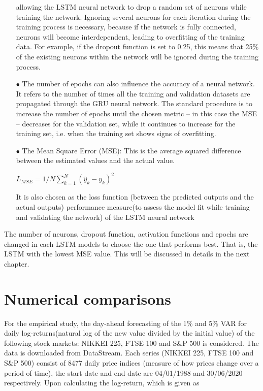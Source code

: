\documentclass[a4paper,11pt,oneside]{book}
\begin{document}
\begin{itemize}
allowing the LSTM neural network to drop a random set of neurons while
training the network. Ignoring several neurons for each iteration during the
training process is necessary, because if the network is fully connected,
neurons will become interdependent, leading to overfitting of the training data. For example, if the dropout function is set to 0.25, this means that 25\% of the existing
neurons within the network will be ignored during the training process.
\item[$\bullet$] The number of epochs can also influence the accuracy of a neural network. It
refers to the number of times all the training and validation datasets are
propagated through the GRU neural network. The standard procedure is to
increase the number of epochs until the chosen metric – in this case the MSE
– decreases for the validation set, while it continues to increase for the training
set, i.e. when the training set shows signs of overfitting.
\item[$\bullet$] The Mean Square Error (MSE): This is the average squared difference between the estimated values and the actual value.

\begin{center}
	$L_{MSE} = 1/N\sum_{k=1}^{N} ({\hat{y}}_{k}-y_k)^2$
\end{center}
It is also chosen as the loss function (between the predicted outputs and the actual outputs) performance measure(to assess the model fit while
training and validating the network) of the
LSTM neural network
\end{itemize}

The number of neurons, dropout function, activation functions and epochs are changed in each LSTM models to choose the one that performs best. That is, the LSTM with the lowest MSE value. This will be discussed in details in the next chapter.


\chapter{Numerical comparisons}
For the empirical study, the day-ahead forecasting of the 1\% and 5\% VAR for daily log-returns(natural log of the new value divided by the initial value) of the following stock markets: NIKKEI 225, FTSE 100 and S\&P 500 is considered. The data is downloaded from DataStream. Each series (NIKKEI 225, FTSE 100 and S\&P 500) consist of 8477 daily price indices (measure of how prices change over a period of time), the start date and end date are 04/01/1988 and 30/06/2020 respectively. Upon calculating the log-return, which is given as 
\end{document}
